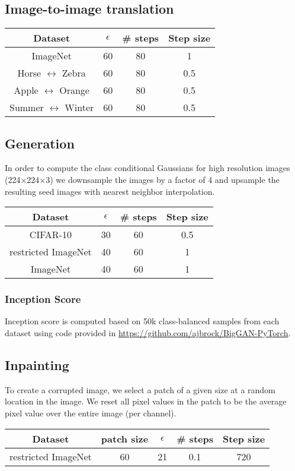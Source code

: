\documentclass{article}
\newcommand{\HtoZ}{Horse $\leftrightarrow$ Zebra}
\newcommand{\StoW}{Summer $\leftrightarrow$ Winter}
\newcommand{\AtoO}{Apple $\leftrightarrow$ Orange}
\begin{document}
{\subsection{Image-to-image translation}

\begin{center}
\setlength{\tabcolsep}{.8cm}
\begin{tabular}{cccc}
\toprule 
Dataset & $\epsilon$ & \# steps & Step size \\
\midrule
ImageNet & 60 & 80 & 1 \\
{\HtoZ} & 60 & 80 & 0.5 \\
{\AtoO} & 60 & 80 & 0.5 \\
{\StoW} & 60 & 80 & 0.5 \\
\bottomrule 
\end{tabular}
\end{center}

\subsection{Generation}
In order to compute the class conditional Gaussians for high resolution images
(224$\times$224$\times$3) we downsample the images by a factor of 4 and upsample
the resulting seed images with nearest neighbor interpolation.

\begin{center}
\setlength{\tabcolsep}{.8cm}
\begin{tabular}{cccc}
\toprule 
Dataset & $\epsilon$ & \# steps & Step size \\
\midrule
CIFAR-10 & 30 & 60 & 0.5 \\
restricted ImageNet & 40 & 60 & 1 \\
ImageNet & 40 & 60 & 1 \\
\bottomrule 
\end{tabular}
\end{center}

\subsubsection{Inception Score}
\label{app:is}
Inception score is computed based on 50k class-balanced samples from
each dataset using code provided in \url{https://github.com/ajbrock/BigGAN-PyTorch}.

\subsection{Inpainting}
To create a corrupted image, we select a patch of a given size at a random location in the image. We 
reset all pixel values in the patch to be the average pixel value over the entire image (per channel).
\begin{center}
	\setlength{\tabcolsep}{.8cm}
	\begin{tabular}{ccccc}
		\toprule 
		Dataset & patch size & $\epsilon$ & \# steps & Step size \\
		\midrule
		restricted ImageNet & 60 & 21 & 0.1 & 720 \\
		\bottomrule 
	\end{tabular}
\end{center}

}
\end{document}
